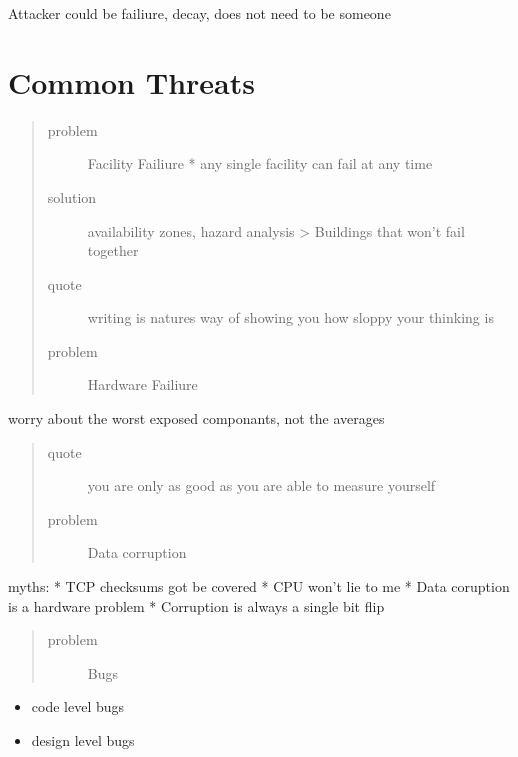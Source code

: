 \documentclass[letterpaper,10pt,english]{sphinxmanual}
\begin{document}
Attacker could be failiure, decay, does not need to be someone


\section{Common Threats}
\label{\detokenize{aws_beyondelevennines_talk:common-threats}}\begin{quote}\begin{description}
\item[{problem}] \leavevmode
Facility Failiure
* any single facility can fail at any time

\item[{solution}] \leavevmode
availability zones, hazard analysis
\sphinxhyphen{}\textgreater{} Buildings that won’t fail together

\item[{quote}] \leavevmode
writing is natures way of showing you how sloppy your thinking is

\item[{problem}] \leavevmode
Hardware Failiure

\end{description}\end{quote}

worry about the worst exposed componants, not the averages
\begin{quote}\begin{description}
\item[{quote}] \leavevmode
you are only as good as you are able to measure yourself

\item[{problem}] \leavevmode
Data corruption

\end{description}\end{quote}

myths:
* TCP checksums got be covered
* CPU won’t lie to me
* Data coruption is a hardware problem
* Corruption is always a single bit flip
\begin{quote}\begin{description}
\item[{problem}] \leavevmode
Bugs

\end{description}\end{quote}
\begin{itemize}
\item {} 
code level bugs

\item {} 
design level bugs

\end{itemize}
\end{document}
